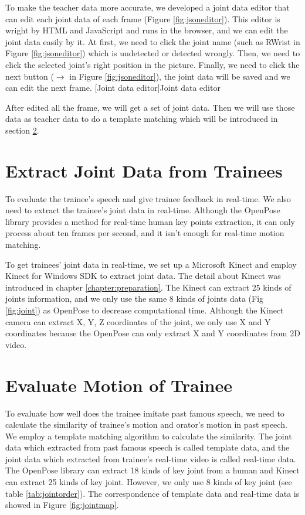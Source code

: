 \par To make the teacher data more accurate, we developed a joint data editor that can edit each joint data of each frame (Figure \ref{fig:jsoneditor}). This editor is wright by HTML and JavaScript and runs in the browser, and we can edit the joint data easily by it. At first, we need to click the joint name (such as RWrist in Figure \ref{fig:jsoneditor}) which is undetected or detected wrongly. Then, we need to click the selected joint's right position in the picture. Finally, we need to click the next button ($\longrightarrow$ in Figure \ref{fig:jsoneditor}), the joint data will be saved and we can edit the next frame. 
[Joint data editor]{Joint data editor}

\par After edited all the frame, we will get a set of joint data. Then we will use those data as teacher data to do a template matching which will be introduced in section \ref{sec:template}.


\section{Extract Joint Data from Trainees}
\par To evaluate the trainee's speech and give trainee feedback in real-time. We also need to extract the trainee's joint data in real-time. Although the OpenPose library provides a method for real-time human key points extraction, it can only process about ten frames per second, and it isn't enough for real-time motion matching. 
\par To get trainees' joint data in real-time, we set up a Microsoft Kinect and employ Kinect for Windows SDK to extract joint data. The detail about Kinect was introduced in chapter \ref{chapter:preparation}. The Kinect can extract 25 kinds of joints information, and we only use the same 8 kinds of joints data (Fig \ref{fig:joint}) as OpenPose to decrease computational time. Although the Kinect camera can extract X, Y, Z coordinates of the joint, we only use X and Y coordinates because the OpenPose can only extract X and Y coordinates from 2D video. 

\section{Evaluate Motion of Trainee}
\label{sec:template}
\par To evaluate how well does the trainee imitate past famous speech, we need to calculate the similarity of trainee's motion and orator's motion in past speech. We employ a template matching algorithm to calculate the similarity. The joint data which extracted from past famous speech is called template data, and the joint data which extracted from trainee's real-time video is called real-time data. The OpenPose library can extract 18 kinds of key joint from a human and Kinect can extract 25 kinds of key joint. However, we only use 8 kinds of key joint (see table \ref{tab:jointorder}). The correspondence of template data and real-time data is showed in Figure \ref{fig:jointmap}.

